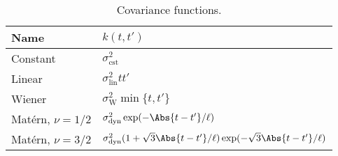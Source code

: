 \begin{table}
	\centering
	\caption{
		Covariance functions.}
	\label{kks:tab:covfuncs}
	\renewcommand{\arraystretch}{1.2}
	\begin{tabular}{l l}
		\toprule
		Name                & $k(t, t')$                                                                                     \\
		\midrule
		Constant            & $\sigma_{\text{cst}}^2$                                                                        \\
		Linear              & $\sigma_{\text{lin}}^2 t t'$                                                                   \\
		Wiener              & $\sigma_{\text{W}}^2 \min \{ t, t' \}$                                                         \\
		Matérn, $\nu = 1/2$ & $\sigma_{\text{dyn}}^2 \exp (-\Abs{t - t'} / \ell)$                                            \\
		Matérn, $\nu = 3/2$ & $\sigma_{\text{dyn}}^2 (1 +\sqrt{3} \Abs{t - t'} / \ell) \exp (-\sqrt{3} \Abs{t - t'} / \ell)$ \\
		\bottomrule
	\end{tabular}
\end{table}

